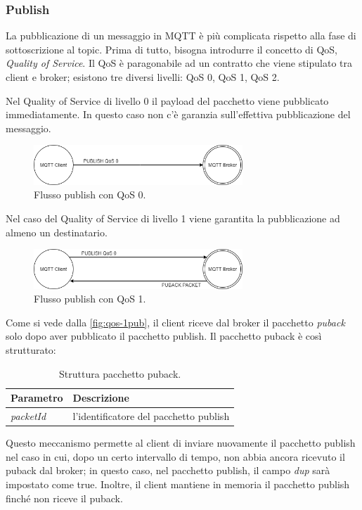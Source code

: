 \documentclass[binding=0.6cm,TFA]{sapthesis}
\begin{document}
\begin{large}
\subsubsection{Publish}
La pubblicazione di un messaggio in MQTT è più complicata rispetto alla fase di sottoscrizione al topic. Prima di tutto, bisogna introdurre il concetto di QoS, \textit{Quality of Service}. Il QoS è paragonabile ad un contratto che viene stipulato tra client e broker; esistono tre diversi livelli: QoS 0, QoS 1, QoS 2.


Nel Quality of Service di livello 0 il payload del pacchetto viene pubblicato immediatamente. In questo caso non c'è garanzia sull'effettiva pubblicazione del messaggio.
\begin{figure}[h]
\centering
\includegraphics[width=0.7\textwidth]{images/publish-qos0.png}
\caption{Flusso publish con QoS 0.}
\label{fig:qos-0pub}
\end{figure}

Nel caso del Quality of Service di livello 1 viene garantita la pubblicazione ad almeno un destinatario.
\begin{figure}[h]
\centering
\includegraphics[width=0.7\textwidth]{images/publish-qos1.png}
\caption{Flusso publish con QoS 1.}
\label{fig:qos-1pub}
\end{figure}

Come si vede dalla \autoref{fig:qos-1pub}, il client riceve dal broker il pacchetto \textit{puback} solo dopo aver pubblicato il pacchetto publish. 
Il pacchetto puback è così strutturato:
\begin{table}[h]
\caption{Struttura pacchetto puback.}
\label{tab:puback}
\begin{tabular}{lp{}}
\toprule
\textbf{Parametro} & \textbf{Descrizione} \\
\midrule
\textit{packetId} & l'identificatore del pacchetto publish \\
\bottomrule
\end{tabular}
\end{table}

Questo meccanismo permette al client di inviare nuovamente il pacchetto publish nel caso in cui, dopo un certo intervallo di tempo, non abbia ancora ricevuto il puback dal broker; in questo caso, nel pacchetto publish, il campo \textit{dup} sarà impostato come true. Inoltre, il client mantiene in memoria il pacchetto publish finché non riceve il puback.


\end{large}
\end{document}
